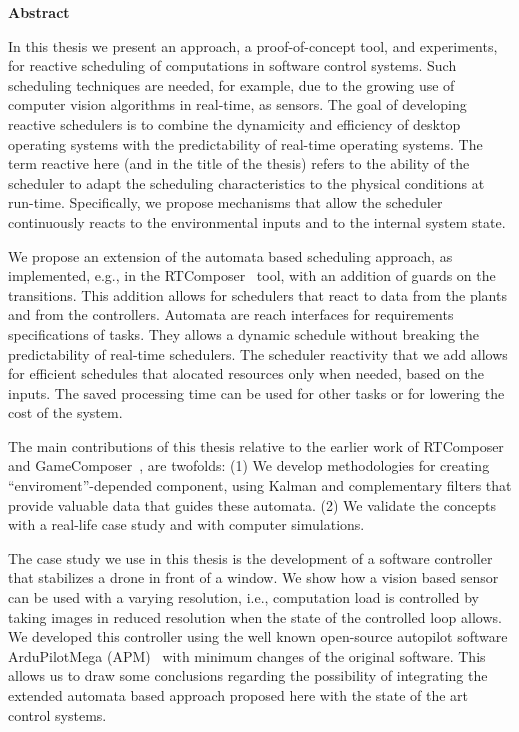 \documentclass[../hodai_thesis.tex]{subfiles}
\begin{document}
\begin{center}
\LARGE \textbf{Abstract}
\end{center}

In this thesis we present an approach, a proof-of-concept tool, and experiments, for reactive scheduling of computations in software control systems. 
Such scheduling techniques are needed, for example, due to the growing use of computer vision algorithms in real-time, as sensors.
The goal of developing reactive schedulers is to combine the dynamicity and efficiency of desktop operating systems with the predictability of real-time operating systems.
The term reactive here (and in the title of the thesis) refers to the ability of the scheduler to adapt the scheduling characteristics to the physical conditions at run-time. 
Specifically, we propose mechanisms that allow the scheduler continuously reacts to the environmental inputs and to the internal system state. 

We propose an extension of the automata based scheduling approach, as implemented, e.g., in the RTComposer~\cite{RTComposer} tool, with an addition of guards on the
transitions. This addition allows for schedulers that react to data from the plants and from the controllers. Automata are reach interfaces for requirements specifications of tasks. They
allows a dynamic schedule without breaking the predictability of real-time schedulers. The scheduler reactivity that we add allows for efficient schedules that 
alocated resources only when needed, based on the inputs. The saved processing time can be used for other tasks or for lowering the cost of the system.

The main contributions of this thesis relative to the earlier work of RTComposer~\cite{RTComposer} and GameComposer~\cite{Merav}, are twofolds: (1) We develop methodologies for
creating ``enviroment''-depended component, using Kalman and complementary filters that provide valuable data that guides these automata. (2) We validate the concepts with a real-life 
case study and with computer simulations.

The case study we use in this thesis is the development of a software controller that stabilizes a drone in front of a window. We show how a vision based sensor can be used with a varying resolution, i.e., computation load is controlled by taking images in reduced resolution when the state of the controlled loop allows. We developed this controller using the well known 
open-source autopilot software ArduPilotMega (APM)~\cite{APM} with minimum changes of the original software. This allows us to draw some conclusions regarding the possibility of integrating the extended 
automata based approach proposed here with the state of the art control systems.
\end{document}
